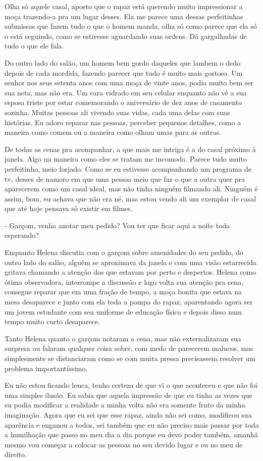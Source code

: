 Olha só aquele casal, aposto que o rapaz está querendo muito impressionar a moça trazendo-a pra um lugar desses. Ela me parece uma dessas perfeitinhas submissas que fazem tudo o que o homem manda, olha só como parece que ela só o está seguindo, como se estivesse aguardando suas ordens. Dá gargalhadas de tudo o que ele fala.

Do outro lado do salão, um homem bem gordo daqueles que lambem o dedo depois de cada mordida, fazendo parecer que tudo é muito mais gostoso. Um senhor nos seus setenta anos com uma moça de vinte anos, podia muito bem ser sua neta, mas não era. Um cara vidrado em seu celular enquanto não vê a sua esposa triste por estar comemorando o aniversário de dez anos de casamento sozinha. Muitas pessoas ali vivendo suas vidas, cada uma delas com suas histórias. Eu adoro reparar nas pessoas, perceber pequenos detalhes, como a maneira como comem ou a maneira como olham umas para as outras. 

De todas as cenas pra acompanhar, a que mais me intriga é a do casal próximo à janela. Algo na maneira como eles se tratam me incomoda. Parece tudo muito perfeitinho, meio forjado. Como se eu estivesse acompanhando um programa de tv, desses de namoro em que uma pessoa meio que faz o que a outra quer pra aparecerem como um casal ideal, mas não tinha ninguém filmando ali. Ninguém é assim, bom, eu achava que não era né, mas estou vendo ali um exemplar de casal que até hoje pensava só existir em filmes.

- Garçom, venha anotar meu pedido? Vou ter que ficar aqui a noite toda esperando?

Enquanto Helena discutia com o garçom sobre amenidades do seu pedido, do outro lado do salão, alguém se aproximava da janela e com uma visão estarrecida gritava chamando a atenção dos que estavam por perto e despertos. Helena como ótima observadora, interrompe a discussão e logo volta sua atenção pra cena, consegue reparar que em uma fração de tempo, a moça bonita que estava na mesa desaparece e junto com ela toda a pompa do rapaz, aparentando agora ser um jovem estudante com seu uniforme de educação física e depois disso num tempo muito curto desaparece.

Tanto Helena quanto o garçom notaram a cena, mas não externalizaram sua surpresa ou falaram qualquer coisa sobre, com medo de parecerem malucos, mas simplesmente se distanciaram como se com muita pressa precisassem resolver um problema importantíssimo.

Eu não estou ficando louca, tenho certeza de que vi o que aconteceu e que não foi uma simples ilusão. Eu sabia que aquela impressão de que eu tinha as vezes que eu podia modificar a realidade a minha volta não era somente fruto da minha imaginação. Agora que eu sei que esse rapaz, ainda não sei como, modificou sua aparência e enganou a todos, sei também que eu não preciso mais passar por toda a humilhação que passo no meu dia a dia porque eu devo poder também, amanhã mesmo vou começar a colocar as pessoas no seu devido lugar e eu no meu de direito.


